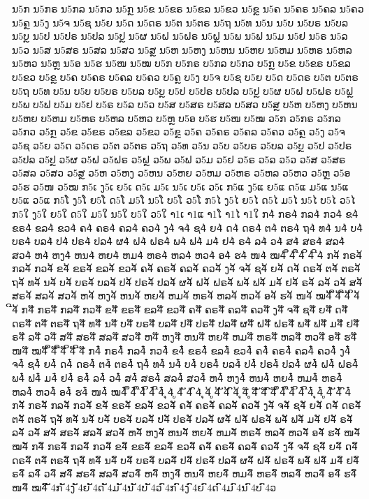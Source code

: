 {	%
	ນ5ກ ນ5ກຣ ນ5ກລ ນ5ກວ ນ5ກຼ ນ5ຂ ນ5ຂຣ ນ5ຂລ ນ5ຂວ ນ5ຂຼ ນ5ຄ ນ5ຄຣ ນ5ຄລ ນ5ຄວ ນ5ຄຼ ນ5ງ ນ5ຈ ນ5ຊ ນ5ຍ ນ5ດ ນ5ດຣ ນ5ຕ ນ5ຕຣ ນ5ຖ ນ5ທ ນ5ນ ນ5ບ ນ5ບຣ ນ5ບລ ນ5ບຼ ນ5ປ ນ5ປຣ ນ5ປລ ນ5ປຼ ນ5ຜ ນ5ຝ ນ5ຝຣ ນ5ຝຼ ນ5ພ ນ5ຟ ນ5ມ ນ5ຢ ນ5ຣ ນ5ລ ນ5ວ ນ5ສ ນ5ສຣ ນ5ສລ ນ5ສວ ນ5ສຼ ນ5ຫ ນ5ຫງ ນ5ຫນ ນ5ຫຍ ນ5ຫມ ນ5ຫຣ ນ5ຫລ ນ5ຫວ ນ5ຫຼ ນ5ອ ນ5ຮ ນ5ໜ ນ5ໝ
	ບ5ກ ບ5ກຣ ບ5ກລ ບ5ກວ ບ5ກຼ ບ5ຂ ບ5ຂຣ ບ5ຂລ ບ5ຂວ ບ5ຂຼ ບ5ຄ ບ5ຄຣ ບ5ຄລ ບ5ຄວ ບ5ຄຼ ບ5ງ ບ5ຈ ບ5ຊ ບ5ຍ ບ5ດ ບ5ດຣ ບ5ຕ ບ5ຕຣ ບ5ຖ ບ5ທ ບ5ນ ບ5ບ ບ5ບຣ ບ5ບລ ບ5ບຼ ບ5ປ ບ5ປຣ ບ5ປລ ບ5ປຼ ບ5ຜ ບ5ຝ ບ5ຝຣ ບ5ຝຼ ບ5ພ ບ5ຟ ບ5ມ ບ5ຢ ບ5ຣ ບ5ລ ບ5ວ ບ5ສ ບ5ສຣ ບ5ສລ ບ5ສວ ບ5ສຼ ບ5ຫ ບ5ຫງ ບ5ຫນ ບ5ຫຍ ບ5ຫມ ບ5ຫຣ ບ5ຫລ ບ5ຫວ ບ5ຫຼ ບ5ອ ບ5ຮ ບ5ໜ ບ5ໝ
	ວ5ກ ວ5ກຣ ວ5ກລ ວ5ກວ ວ5ກຼ ວ5ຂ ວ5ຂຣ ວ5ຂລ ວ5ຂວ ວ5ຂຼ ວ5ຄ ວ5ຄຣ ວ5ຄລ ວ5ຄວ ວ5ຄຼ ວ5ງ ວ5ຈ ວ5ຊ ວ5ຍ ວ5ດ ວ5ດຣ ວ5ຕ ວ5ຕຣ ວ5ຖ ວ5ທ ວ5ນ ວ5ບ ວ5ບຣ ວ5ບລ ວ5ບຼ ວ5ປ ວ5ປຣ ວ5ປລ ວ5ປຼ ວ5ຜ ວ5ຝ ວ5ຝຣ ວ5ຝຼ ວ5ພ ວ5ຟ ວ5ມ ວ5ຢ ວ5ຣ ວ5ລ ວ5ວ ວ5ສ ວ5ສຣ ວ5ສລ ວ5ສວ ວ5ສຼ ວ5ຫ ວ5ຫງ ວ5ຫນ ວ5ຫຍ ວ5ຫມ ວ5ຫຣ ວ5ຫລ ວ5ຫວ ວ5ຫຼ ວ5ອ ວ5ຮ ວ5ໜ ວ5ໝ
	ກ5ເ ງ5ເ ຍ5ເ ດ5ເ ມ5ເ ນ5ເ ບ5ເ ວ5ເ
	ກ5ແ ງ5ແ ຍ5ແ ດ5ແ ມ5ແ ນ5ແ ບ5ແ ວ5ແ
	ກ5ໂ ງ5ໂ ຍ5ໂ ດ5ໂ ມ5ໂ ນ5ໂ ບ5ໂ ວ5ໂ
	ກ5ໄ ງ5ໄ ຍ5ໄ ດ5ໄ ມ5ໄ ນ5ໄ ບ5ໄ ວ5ໄ
	ກ5ໃ ງ5ໃ ຍ5ໃ ດ5ໃ ມ5ໃ ນ5ໃ ບ5ໃ ວ5ໃ
	າ1ເ າ1ແ າ1ໂ າ1ໄ າ1ໃ
	ກ4່ ກຣ4່ ກລ4່ ກວ4່ ຂ4່ ຂຣ4່ ຂລ4່ ຂວ4່ ຄ4່ ຄຣ4່ ຄລ4່ ຄວ4່ ງ4່ ຈ4່ ຊ4່ ຍ4່ ດ4່ ດຣ4່ ຕ4່ ຕຣ4່ ຖ4່ ທ4່ ນ4່ ບ4່ ບຣ4່ ບລ4່ ປ4່ ປຣ4່ ປລ4່ ຜ4່ ຝ4່ ຝຣ4່ ພ4່ ຟ4່ ມ4່ ຢ4່ ຣ4່ ລ4່ ວ4່ ສ4່ ສຣ4່ ສລ4່ ສວ4່ ຫ4່ ຫງ4່ ຫນ4່ ຫຍ4່ ຫມ4່ ຫຣ4່ ຫລ4່ ຫວ4່ ອ4່ ຮ4່ ໜ4່ ໝ4່ ຶ4່ ື4່ ິ4່ ີ4່
	ກ4້ ກຣ4້ ກລ4້ ກວ4້ ຂ4້ ຂຣ4້ ຂລ4້ ຂວ4້ ຄ4້ ຄຣ4້ ຄລ4້ ຄວ4້ ງ4້ ຈ4້ ຊ4້ ຍ4້ ດ4້ ດຣ4້ ຕ4້ ຕຣ4້ ຖ4້ ທ4້ ນ4້ ບ4້ ບຣ4້ ບລ4້ ປ4້ ປຣ4້ ປລ4້ ຜ4້ ຝ4້ ຝຣ4້ ພ4້ ຟ4້ ມ4້ ຢ4້ ຣ4້ ລ4້ ວ4້ ສ4້ ສຣ4້ ສລ4້ ສວ4້ ຫ4້ ຫງ4້ ຫນ4້ ຫຍ4້ ຫມ4້ ຫຣ4້ ຫລ4້ ຫວ4້ ອ4້ ຮ4້ ໜ4້ ໝ4້ ຶ4້ ື4້ ິ4້ ີ4້
	ກ4໊ ກຣ4໊ ກລ4໊ ກວ4໊ ຂ4໊ ຂຣ4໊ ຂລ4໊ ຂວ4໊ ຄ4໊ ຄຣ4໊ ຄລ4໊ ຄວ4໊ ງ4໊ ຈ4໊ ຊ4໊ ຍ4໊ ດ4໊ ດຣ4໊ ຕ4໊ ຕຣ4໊ ຖ4໊ ທ4໊ ນ4໊ ບ4໊ ບຣ4໊ ບລ4໊ ປ4໊ ປຣ4໊ ປລ4໊ ຜ4໊ ຝ4໊ ຝຣ4໊ ພ4໊ ຟ4໊ ມ4໊ ຢ4໊ ຣ4໊ ລ4໊ ວ4໊ ສ4໊ ສຣ4໊ ສລ4໊ ສວ4໊ ຫ4໊ ຫງ4໊ ຫນ4໊ ຫຍ4໊ ຫມ4໊ ຫຣ4໊ ຫລ4໊ ຫວ4໊ ອ4໊ ຮ4໊ ໜ4໊ ໝ4໊ ຶ4໊ ື4໊ ິ4໊ ີ4໊
	ກ4໋໋ ກຣ4໋໋ ກລ4໋໋ ກວ4໋໋ ຂ4໋໋ ຂຣ4໋໋ ຂລ4໋໋ ຂວ4໋໋ ຄ4໋໋ ຄຣ4໋໋ ຄລ4໋໋ ຄວ4໋໋ ງ4໋໋ ຈ4໋໋ ຊ4໋໋ ຍ4໋໋ ດ4໋໋ ດຣ4໋໋ ຕ4໋໋ ຕຣ4໋໋ ຖ4໋໋ ທ4໋໋ ນ4໋໋ ບ4໋໋ ບຣ4໋໋ ບລ4໋໋ ປ4໋໋ ປຣ4໋໋ ປລ4໋໋ ຜ4໋໋ ຝ4໋໋ ຝຣ4໋໋ ພ4໋໋ ຟ4໋໋ ມ4໋໋ ຢ4໋໋ ຣ4໋໋ ລ4໋໋ ວ4໋໋ ສ4໋໋ ສຣ4໋໋ ສລ4໋໋ ສວ4໋໋ ຫ4໋໋ ຫງ4໋໋ ຫນ4໋໋ ຫຍ4໋໋ ຫມ4໋໋ ຫຣ4໋໋ ຫລ4໋໋ ຫວ4໋໋ ອ4໋໋ ຮ4໋໋ ໜ4໋໋ ໝ4໋໋ ຶ4໋໋ ື4໋໋ ິ4໋໋ ີ4໋໋
	 ຸ4່ ູ4່ ັ4່ ົ4່
	 ຸ4້ ູ4້ ັ4້ ົ4້
	 ຸ4໊ ູ4໊ ັ4໊ ົ4໊
	 ຶ4໋ ື4໋ ິ4໋ ີ4໋ ຸ4໋ ູ4໋ ັ4໋ ົ4໋
	ກ4ັ ກຣ4ັ ກລ4ັ ກວ4ັ ຂ4ັ ຂຣ4ັ ຂລ4ັ ຂວ4ັ ຄ4ັ ຄຣ4ັ ຄລ4ັ ຄວ4ັ ງ4ັ ຈ4ັ ຊ4ັ ຍ4ັ ດ4ັ ດຣ4ັ ຕ4ັ ຕຣ4ັ ຖ4ັ ທ4ັ ນ4ັ ບ4ັ ບຣ4ັ ບລ4ັ ປ4ັ ປຣ4ັ ປລ4ັ ຜ4ັ ຝ4ັ ຝຣ4ັ ພ4ັ ຟ4ັ ມ4ັ ຢ4ັ ຣ4ັ ລ4ັ ວ4ັ ສ4ັ ສຣ4ັ ສລ4ັ ສວ4ັ ຫ4ັ ຫງ4ັ ຫນ4ັ ຫຍ4ັ ຫມ4ັ ຫຣ4ັ ຫລ4ັ ຫວ4ັ ອ4ັ ຮ4ັ ໜ4ັ ໝ4ັ
	ກ4ົ ກຣ4ົ ກລ4ົ ກວ4ົ ຂ4ົ ຂຣ4ົ ຂລ4ົ ຂວ4ົ ຄ4ົ ຄຣ4ົ ຄລ4ົ ຄວ4ົ ງ4ົ ຈ4ົ ຊ4ົ ຍ4ົ ດ4ົ ດຣ4ົ ຕ4ົ ຕຣ4ົ ຖ4ົ ທ4ົ ນ4ົ ບ4ົ ບຣ4ົ ບລ4ົ ປ4ົ ປຣ4ົ ປລ4ົ ຜ4ົ ຝ4ົ ຝຣ4ົ ພ4ົ ຟ4ົ ມ4ົ ຢ4ົ ຣ4ົ ລ4ົ ວ4ົ ສ4ົ ສຣ4ົ ສລ4ົ ສວ4ົ ຫ4ົ ຫງ4ົ ຫນ4ົ ຫຍ4ົ ຫມ4ົ ຫຣ4ົ ຫລ4ົ ຫວ4ົ ອ4ົ ຮ4ົ ໜ4ົ ໝ4ົ
	ັ4ກ ັ4ງ ັ4ຍ ັ4ດ ັ4ມ ັ4ນ ັ4ບ ັ4ວ
	ົ4ກ ົ4ງ ົ4ຍ ົ4ດ ົ4ມ ົ4ນ ົ4ບ ົ4ວ
}
